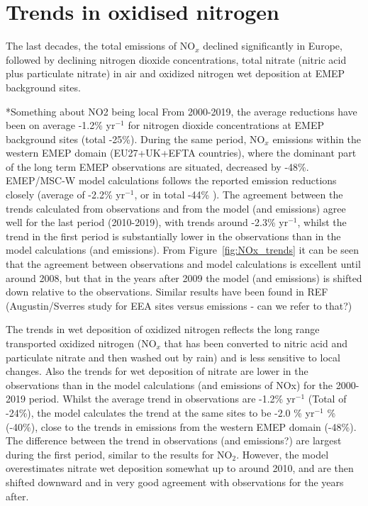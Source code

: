 \section{\label{sec:Trends_oxidised_nitrogen }Trends in oxidised nitrogen}



The last decades, the total emissions of NO$_x$ declined significantly in Europe, followed by declining nitrogen dioxide concentrations, total nitrate (nitric acid plus particulate nitrate) in air and oxidized nitrogen wet deposition at EMEP background sites. 

*Something about NO2 being local
From 2000-2019, the average reductions have been on average -1.2\% yr$^{-1}$ for nitrogen dioxide concentrations at EMEP background sites (total -25\%). During the same period, NO$_x$ emissions within the western EMEP domain (EU27+UK+EFTA countries), where the dominant part of the long term EMEP observations are situated, decreased by -48\%. EMEP/MSC-W model calculations follows the reported emission reductions closely (average of -2.2\% yr$^{-1}$, or in total -44\% ). 
The agreement between the trends calculated from observations and from the model (and emissions) agree well for the last period (2010-2019), with trends around -2.3\% yr$^{-1}$, whilst the trend in the first period is substantially lower in the observations than in the model calculations (and emissions). From Figure~\ref{fig:NOx_trends} it can be seen that the agreement between observations and model calculations is excellent until around 2008, but that in the years after 2009 the model (and emissions) is shifted down relative to the observations. Similar results have been found in REF (Augustin/Sverres study for EEA sites versus emissions - can we refer to that?)


The trends in wet deposition of oxidized nitrogen reflects the long range transported oxidized nitrogen (NO$_x$ that has been converted to nitric acid and particulate nitrate and then washed out by rain) and is less sensitive to local changes. Also the trends for wet deposition of nitrate are lower in the observations than in the model calculations (and emissions of NOx) for the 2000-2019 period. Whilst the average trend in observations are -1.2\% yr$^{-1}$ (Total of -24\%), the model calculates the trend at the same sites to be -2.0 \% yr$^{-1}$ \% (-40\%), close to the trends in emissions from the western EMEP domain (-48\%). The difference between the trend in observations (and emissions?) are largest during the first period, similar to the results for NO$_2$. However, the model overestimates nitrate wet deposition somewhat up to around 2010, and are then shifted downward and in very good agreement with observations for the years after. 

